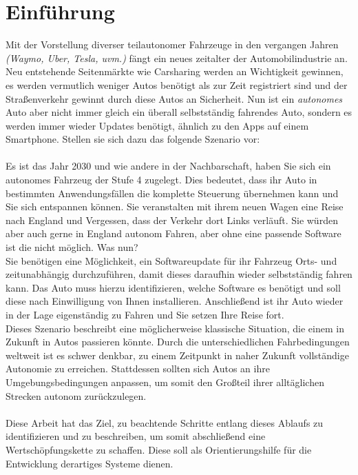 \section{Einführung}
Mit der Vorstellung diverser teilautonomer Fahrzeuge in den vergangen Jahren \textit{(Waymo, Uber, Tesla, uvm.)} fängt ein neues zeitalter der Automobilindustrie an. Neu entstehende Seitenmärkte wie Carsharing werden an Wichtigkeit gewinnen, es werden vermutlich weniger Autos benötigt als zur Zeit registriert sind und der Straßenverkehr gewinnt durch diese Autos an Sicherheit. Nun ist ein \textit{autonomes} Auto aber nicht immer gleich ein überall selbstständig fahrendes Auto, sondern es werden immer wieder Updates benötigt, ähnlich zu den Apps auf einem Smartphone. Stellen sie sich dazu das folgende Szenario vor:\\\\
Es ist das Jahr 2030 und wie andere in der Nachbarschaft, haben Sie sich ein autonomes Fahrzeug der Stufe 4 zugelegt. Dies bedeutet, dass ihr Auto in bestimmten Anwendungsfällen die komplette Steuerung übernehmen kann und Sie sich entspannen können. Sie veranstalten mit ihrem neuen Wagen eine Reise nach England und Vergessen, dass der Verkehr dort Links verläuft. Sie würden aber auch gerne in England autonom Fahren, aber ohne eine passende Software ist die nicht möglich. Was nun?\\
Sie benötigen eine Möglichkeit, ein Softwareupdate für ihr Fahrzeug Orts- und zeitunabhängig durchzuführen, damit dieses daraufhin wieder selbstständig fahren kann. Das Auto muss hierzu identifizieren, welche Software es benötigt und soll diese nach Einwilligung von Ihnen installieren. Anschließend ist ihr Auto wieder in der Lage eigenständig zu Fahren und Sie setzen Ihre Reise fort.\\
Dieses Szenario beschreibt eine möglicherweise klassische Situation, die einem in Zukunft in Autos passieren könnte. Durch die unterschiedlichen Fahrbedingungen weltweit ist es schwer denkbar, zu einem Zeitpunkt in naher Zukunft vollständige Autonomie zu erreichen. Stattdessen sollten sich Autos an ihre Umgebungsbedingungen anpassen, um somit den Großteil ihrer alltäglichen Strecken autonom zurückzulegen.\\\\
Diese Arbeit hat das Ziel, zu beachtende Schritte entlang dieses Ablaufs zu identifizieren und zu beschreiben, um somit abschließend eine Wertschöpfungskette zu schaffen. Diese soll als Orientierungshilfe für die Entwicklung derartiges Systeme dienen.\\\\

